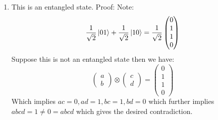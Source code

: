 \documentclass[12pt]{article}
\begin{document}
\begin{enumerate}[font=\bfseries]
    \item This is an entangled state. Proof: Note:
    \[\frac{1}{\sqrt{2}}\ket{01} + \frac{1}{\sqrt{2}}\ket{10} = 
            \frac{1}{\sqrt{2}}
            \begin{pmatrix}
            0 \\ 1 \\ 1 \\ 0
            \end{pmatrix}
            \]
        Suppose this is not an entangled state then we have:
        \[\begin{pmatrix}
        a \\b
        \end{pmatrix}
        \otimes
        \begin{pmatrix}
        c \\d
        \end{pmatrix}
        =
        \begin{pmatrix}
        0 \\ 1 \\ 1 \\ 0
        \end{pmatrix}
        \]
        Which implies $ac = 0, ad = 1, bc = 1, bd = 0$ which further implies $abcd = 1 \neq 0 = abcd$ which gives the desired contradiction.
        

\end{enumerate}
\end{document}
